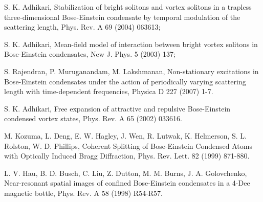 \documentclass[onecolumn]{elsart3p}
\begin{document}
\begin{thebibliography}{99}
S. K. Adhikari,
{ Stabilization of bright solitons and vortex solitons in a
trapless
three-dimensional Bose-Einstein condensate by temporal modulation of the
scattering length},
Phys. Rev. A 69 (2004) 063613;

S. K. Adhikari,
{ Mean-field model of interaction between bright vortex solitons in
Bose-Einstein condensates},
New J. Phys. 5 (2003) 137;

S. Rajendran,  P. Muruganandam, M.  Lakshmanan,
Non-stationary excitations in Bose-Einstein condensates under the action
of periodically varying scattering length with time-dependent
frequencies, Physica D 227 (2007) 1-7.

  S. K. Adhikari,
{ Free expansion of attractive and repulsive Bose-Einstein
condensed vortex states},
Phys. Rev. A 65 (2002) 033616.




  M. Kozuma, L. Deng, E. W. Hagley, J. Wen,
R. Lutwak,
K. Helmerson, S. L. Rolston, W. D. Phillips,
{ Coherent Splitting of Bose-Einstein Condensed Atoms with Optically
Induced Bragg Diffraction},
Phys. Rev. Lett.  82 (1999) 871-880.



L. V. Hau, B. D. Busch, C. Liu, Z. Dutton,
M. M. Burns, J. A. Golovchenko,
{ Near-resonant spatial images of confined Bose-Einstein condensates
in a 4-Dee magnetic bottle},
Phys. Rev. A 58 (1998) R54-R57.




\end{thebibliography}
\end{document}
